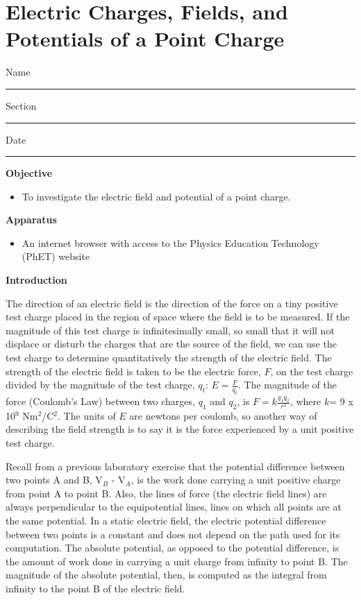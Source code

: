 
\section{Electric Charges, Fields, and Potentials of a Point Charge}

Name \rule{2.0in}{0.1pt}\hfill{}Section \rule{1.0in}{0.1pt}\hfill{}Date
\rule{1.0in}{0.1pt}

\textbf{Objective}

\begin{itemize}
\item To investigate the electric field and potential of a point charge.
\end{itemize}

\textbf{Apparatus}

\begin{itemize}
\item An internet browser with access to the Physics Education Technology (PhET) website
\end{itemize}

\textbf{Introduction}

The direction of an electric field is the direction of the force on
a tiny positive test charge placed in the region of space where the
field is to be measured. If the magnitude of this test charge is infinitesimally
small, so small that it will not displace or disturb the charges that
are the source of the field, we can use the test charge to determine
quantitatively the strength of the electric field. The strength of
the electric field is taken to be the electric force, $F$, on the test
charge divided by the magnitude of the test charge, \( q_{t} \):
\( E=\frac{F}{q_{t}} \). The magnitude of the force (Coulomb's Law) between two charges,
\( q_{1} \) and \( q_{2} \), is \( F=k\frac{q_{1}q_{2}}{r^{2}} \),
where \( k \)= 9 x 10\( ^{9} \) Nm\( ^{2} \)/C\( ^{2} \). The units
of \( E \) are newtons per coulomb, so another way of describing the field
strength is to say it is the force experienced by a unit positive
test charge.

Recall from a previous laboratory exercise that the potential difference
between two points A and B, V\( _{B} \) - V\( _{A} \), is the work
done carrying a unit positive charge from point A to point B. Also,
the lines of force (the electric field lines) are always perpendicular
to the equipotential lines, lines on which all points are at the same
potential. In a static electric field, the electric potential difference
between two points is a constant and does not depend on the path used
for its computation. The absolute potential, as opposed to the potential
difference, is the amount of work done in carrying a unit charge from
infinity to point B. The magnitude of the absolute potential, then,
is computed as the integral from infinity to the point B of the electric
field.

